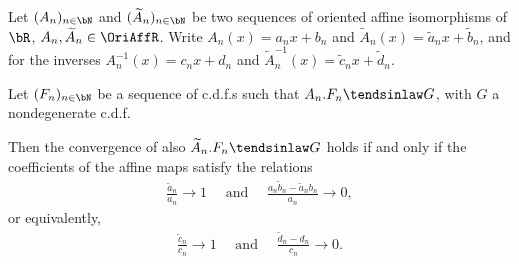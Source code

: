 \begin{theorem}
  \label{thm:convergence-to-types-different-affine}
  Let $(A_n)_{n \in \bN}$ and
  $(\widetilde{A}_n)_{n \in \bN}$ be two sequences of oriented
  affine isomorphisms of $\bR$, $A_n, \widetilde{A}_n \in \OriAffR$.
  Write $A_n(x) = a_n x + b_n$
  and $\widetilde{A}_n(x) = \tilde{a}_n x + \tilde{b}_n$,
  and for the inverses $A_n^{-1}(x) = c_n x + d_n$
  and $\widetilde{A}^{-1}_n(x) = \tilde{c}_n x + \tilde{d}_n$.

  Let $(F_n)_{n \in \bN}$ be a sequence of c.d.f.s
  such that $A_n.F_n \tendsinlaw G$, with
  $G$ a nondegenerate c.d.f.

  Then the convergence of also $\widetilde{A}_n.F_n \tendsinlaw G$
  holds if and only if the coefficients of the affine maps
  satisfy the relations
  \begin{align*}
    \frac{\tilde{a}_n}{a_n} \to 1
    \quad \text{ and } \quad
    \frac{a_n \tilde{b}_n - \tilde{a}_n b_n}{a_n} \to 0,
  \end{align*}
  or equivalently,
  \begin{align*}
    \frac{\tilde{c}_n}{c_n} \to 1
    \quad \text{ and } \quad
    \frac{\tilde{d}_n - d_n}{c_n} \to 0 .
  \end{align*}
\end{theorem}
